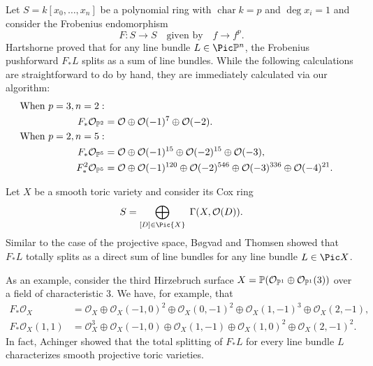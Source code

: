 \documentclass[12pt]{article}
\def\O{\mathcal O}
\numberwithin{equation}{section}
\theoremstyle{theorem}
\numberwithin{thm}{section}
\theoremstyle{definition}
\begin{document}
\renewcommand{\char}{\operatorname{char}}

\begin{exa}
  Let $S = k[x_0,\dots,x_n]$ be a polynomial ring with $\char k = p$ and $\deg x_i = 1$ and consider the Frobenius endomorphism
  \[ F\colon S\to S \quad \text{given by} \quad f \to f^p. \]
  Hartshorne \cite{Hartshorne1970} proved that for any line bundle $L\in\Pic\P^n$, the Frobenius pushforward $F_*L$ splits as a sum of line bundles. While the following calculations are straightforward to do by hand, they are immediately calculated via our algorithm:
  \begin{align*}
    \text{When }p=3, n=2: \\
    F_*\O_{\P^2} &= \O \oplus \O(-1)^7 \oplus \O(-2). \\
    \text{When } p=2, n=5: \\
    F_*\O_{\P^5} &= \O \oplus \O(-1)^{15} \oplus \O(-2)^{15} \oplus \O(-3), \\
    F_*^2\O_{\P^5} &= \O \oplus \O(-1)^{120} \oplus \O(-2)^{546} \oplus \O(-3)^{336} \oplus \O(-4)^{21}.
  \end{align*}
\end{exa}

\begin{exa}
  Let $X$ be a smooth toric variety and consider its Cox ring
  \[ S = \bigoplus_{[D]\in\Pic{X}} \; \Gamma(X, \O(D)). \]
  Similar to the case of the projective space, B{\o}gvad and Thomsen \cite{Bogvad98,Thomsen00} showed that $F_*L$ totally splits as a direct sum of line bundles for any line bundle $L\in\Pic X$.

  As an example, consider the third Hirzebruch surface $X=\P(\O_{\P^1}\oplus \O_{\P^1}(3))$ over a field of characteristic 3. We have, for example, that
  \begin{align*}
    F_*\O_X      &= \O_X   \oplus \O_X(-1,0)^2 \oplus \O_X(0,-1)^2 \oplus \O_X(1,-1)^3 \oplus \O_X(2,-1), \\
    F_*\O_X(1,1) &= \O_X^3 \oplus \O_X(-1,0)   \oplus \O_X(1,-1)   \oplus \O_X(1, 0)^2 \oplus \O_X(2,-1)^2.
  \end{align*}
  In fact, Achinger \cite{Achinger15} showed that the total splitting of $F_*L$ for every line bundle $L$ characterizes smooth projective toric varieties.
\end{exa}
\end{document}
